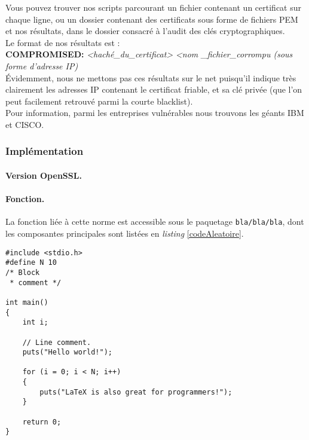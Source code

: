 		Vous pouvez trouver nos scripts parcourant un fichier contenant un 
		certificat sur chaque ligne, ou un dossier contenant des certificats sous 
		forme de fichiers PEM et nos résultats, dans le dossier consacré à l'audit des clés
		cryptographiques.\\
		
		Le format de nos résultats est : \\
		
		\textbf{COMPROMISED:} \textit{<haché\_du\_certificat>} \textit{<nom
		\_fichier\_corrompu (sous forme d'adresse IP)}\\
		
		Évidemment, nous ne mettons pas ces résultats sur le net puisqu'il indique 
		très clairement les adresses IP contenant le certificat friable, et sa clé
		privée (que l'on peut facilement retrouvé parmi la courte blacklist).\\
		
		Pour information, parmi les entreprises vulnérables nous trouvons les géants
		IBM et CISCO.
	
	\subsubsection{Implémentation}
		
		\paragraph{Version OpenSSL.\\}
		
		\paragraph{Fonction.\\}
		La fonction liée à cette norme est accessible sous le paquetage \texttt{bla/bla/bla}, dont les composantes principales sont listées en \textit{listing} \ref{codeAleatoire}.
		
		
		\begin{lstlisting}[style=customc,caption=codeAleatoire.c, label=codeAleatoire]
#include <stdio.h>
#define N 10
/* Block
 * comment */
 
int main()
{
    int i;
 
    // Line comment.
    puts("Hello world!");
 
    for (i = 0; i < N; i++)
    {
        puts("LaTeX is also great for programmers!");
    }
 
    return 0;
}
		\end{lstlisting}
		
